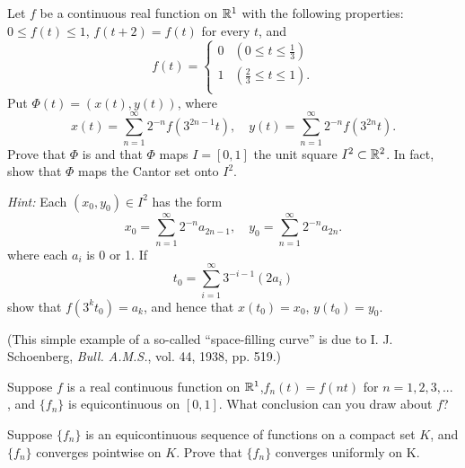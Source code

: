 \begin{myexercise}
    \label{ex:7.14}
    Let $f$ be a continuous real function on ${\protect\mathbb R}^1$ with the following properties:
    $0 \leq f(t) \leq 1$, $f(t + 2) = f(t)$ for every $t$, and
    \begin{equation*}
        f(t) = \left\{ 
            \begin{array}{ll}
                0 & \left( 0 \leq t \leq \frac{1}{3} \right) \\
                1 & \left( \frac{2}{3} \leq t \leq 1 \right) . \\
            \end{array}
         \right.
    \end{equation*}
    Put $\Phi(t) = (x(t), y(t))$, where 
    \begin{equation*}
        x(t) = \sum_{n=1}^{\infty} 2^{-n} f(3^{2n-1} t), \quad 
        y(t) = \sum_{n=1}^{\infty} 2^{-n} f(3^{2n} t).
    \end{equation*}
    Prove that $\Phi$ is  and that $\Phi$ maps $I=[0,1]$  the unit square $I^2 \subset {\protect\mathbb R}^2$.
    In fact, show that $\Phi$ maps the Cantor set onto $I^2$.

    \emph{Hint:} Each $(x_0, y_0) \in I^2$ has the form 
    \begin{equation*}
        x_0 = \sum_{n=1}^{\infty} 2^{-n} a_{2n-1}, \quad 
        y_0 = \sum_{n=1}^{\infty} 2^{-n} a_{2n}.
    \end{equation*}
    where each $a_i$ is 0 or 1. 
    If 
    \begin{equation*}
        t_0 = \sum_{i=1}^{\infty} 3^{-i-1}(2a_i)
    \end{equation*}
    show that $f(3^k t_0) = a_k$, and hence that $x(t_0)=x_0$, $y(t_0)=y_0$.

    (This simple example of a so-called ``space-filling curve'' is due to I. J. Schoenberg, \emph{Bull. A.M.S.}, vol. 44, 1938, pp. 519.)
\end{myexercise}


\begin{myexercise}
    \label{ex:7.15}
    Suppose $f$ is a real continuous function on ${\protect\mathbb R}^1$,$f_n(t) =f(nt)$ for $n =1, 2, 3, ...$ , and
    $\{f_n\}$ is equicontinuous on $[0, 1]$. 
    What conclusion can you draw about $f$?
\end{myexercise}

\begin{myexercise}
    \label{ex:7.16}
    Suppose $\{f_n\}$ is an equicontinuous sequence of functions on a compact set $K$, and $\{f_n\}$ converges pointwise on $K$. 
    Prove that $\{f_n\}$  converges uniformly on K.
\end{myexercise}


